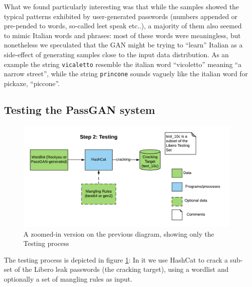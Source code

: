 What we found particularly interesting was that while the samples showed the typical patterns exhibited by user-generated passwords (numbers appended or pre-pended to words, so-called leet speak etc..), a majority of them also seemed to mimic Italian words and phrases: most of these words were meaningless, but nonetheless we speculated that the GAN might be trying to \enquote{learn} Italian as a side-effect of generating samples close to the input data distribution.
As an example the string \texttt{vicaletto} resemble the italian word \enquote{vicoletto} meaning \enquote{a narrow street}, while the string \texttt{princone} sounds vaguely like the italian word for pickaxe, \enquote{piccone}. 

\subsection{Testing the PassGAN system}\label{subsec:passgan-testing}

\begin{figure}[H]
\centering
    \includegraphics[scale=0.8]{figures/testing_only.png}
    \caption{A zoomed-in version on the previous diagram, showing only the Testing process}
    \label{fig:testing_only}
\end{figure}    

The testing process is depicted in figure \ref{fig:testing_only}: In it we use HashCat to crack a sub-set of the Libero leak passwords (the cracking target), using a wordlist and optionally a set of mangling rules as input.

